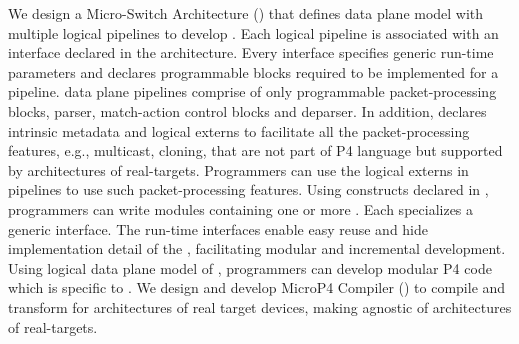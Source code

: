 \documentclass[letterpaper,twocolumn,10pt]{article}
\begin{document}
We design a Micro-Switch Architecture (\uarch) that defines data plane model with multiple logical pipelines to develop \uprograms.
Each logical pipeline is associated with an interface declared in the architecture.
Every interface specifies generic run-time parameters and declares programmable blocks required to be implemented for a pipeline.
\uarch data plane pipelines comprise of only programmable packet-processing blocks, parser, match-action control blocks and deparser. 
In addition, \uarch declares intrinsic metadata and logical externs to facilitate all the packet-processing features, e.g., multicast, cloning, that are not part of P4 language but supported by architectures of real-targets. 
Programmers can use the logical externs in \uarch pipelines to use such packet-processing features.
Using constructs declared in \uarch, programmers can write modules containing one or more \uprograms.
Each \uprogram specializes a generic interface.
The run-time interfaces enable easy reuse and hide implementation detail of the \uprograms, facilitating modular and incremental development.
Using logical data plane model of \uarch, programmers can develop modular P4 code which is specific to \uarch.
We design and develop MicroP4 Compiler (\ucomp) to compile and transform \uprogram for architectures of real target devices, making \uprograms agnostic of architectures of real-targets.
\end{document}
